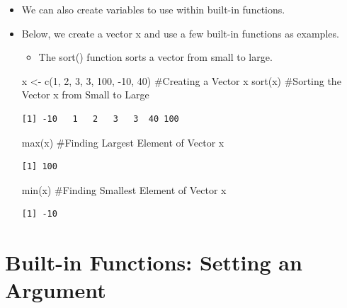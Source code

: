 \documentclass[
  letterpaper,
  DIV=11,
  numbers=noendperiod]{scrreprt}
\newenvironment{Shaded}{\begin{snugshade}}{\end{snugshade}}
\newcommand{\CommentTok}[1]{\textcolor[rgb]{0.37,0.37,0.37}{#1}}
\newcommand{\DecValTok}[1]{\textcolor[rgb]{0.68,0.00,0.00}{#1}}
\newcommand{\FunctionTok}[1]{\textcolor[rgb]{0.28,0.35,0.67}{#1}}
\newcommand{\NormalTok}[1]{\textcolor[rgb]{0.00,0.23,0.31}{#1}}
\newcommand{\OtherTok}[1]{\textcolor[rgb]{0.00,0.23,0.31}{#1}}
\newcommand{\SpecialCharTok}[1]{\textcolor[rgb]{0.37,0.37,0.37}{#1}}
\providecommand{\tightlist}{%
  \setlength{\itemsep}{0pt}\setlength{\parskip}{0pt}}\usepackage{longtable,booktabs,array}
\begin{document}
\begin{itemize}
\item
  We can also create variables to use within built-in functions.
\item
  Below, we create a vector x and use a few built-in functions as
  examples.

  \begin{itemize}
  \tightlist
  \item
    The sort() function sorts a vector from small to large.
  \end{itemize}

\begin{Shaded}
\begin{Highlighting}[]
\NormalTok{x }\OtherTok{\textless{}{-}} \FunctionTok{c}\NormalTok{(}\DecValTok{1}\NormalTok{, }\DecValTok{2}\NormalTok{, }\DecValTok{3}\NormalTok{, }\DecValTok{3}\NormalTok{, }\DecValTok{100}\NormalTok{, }\SpecialCharTok{{-}}\DecValTok{10}\NormalTok{, }\DecValTok{40}\NormalTok{)  }\CommentTok{\#Creating a Vector x}
\FunctionTok{sort}\NormalTok{(x)  }\CommentTok{\#Sorting the Vector x from Small to Large}
\end{Highlighting}
\end{Shaded}

\begin{verbatim}
[1] -10   1   2   3   3  40 100
\end{verbatim}

\begin{Shaded}
\begin{Highlighting}[]
\FunctionTok{max}\NormalTok{(x)  }\CommentTok{\#Finding Largest Element of Vector x}
\end{Highlighting}
\end{Shaded}

\begin{verbatim}
[1] 100
\end{verbatim}

\begin{Shaded}
\begin{Highlighting}[]
\FunctionTok{min}\NormalTok{(x)  }\CommentTok{\#Finding Smallest Element of Vector x}
\end{Highlighting}
\end{Shaded}

\begin{verbatim}
[1] -10
\end{verbatim}
\end{itemize}

\section{Built-in Functions: Setting an
Argument}\label{built-in-functions-setting-an-argument}
\end{document}
